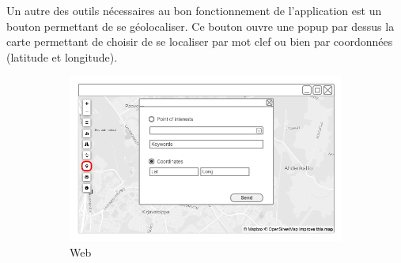 Un autre des outils nécessaires au bon fonctionnement de l'application est un bouton permettant de se géolocaliser. Ce bouton ouvre une popup par dessus la carte permettant de choisir de se localiser par mot clef ou bien par coordonnées (latitude et longitude).


\begin{figure}[ht]
  \centering
  \begin{subfigure}[b]{0.6\textwidth}
    \includegraphics[width=\textwidth]
      {img/c02-application/png/web-basemap-focus.png}
    \caption{Web}
  \end{subfigure}
  ~
  \begin{subfigure}[b]{0.2\textwidth}

\end{subfigure}
\end{figure}
